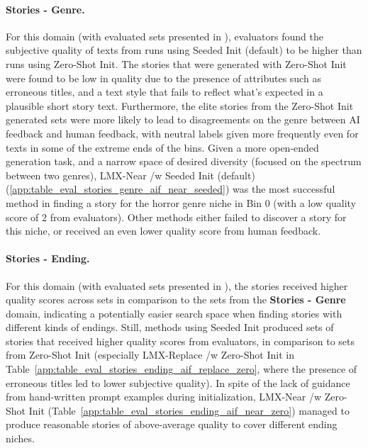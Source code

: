 \paragraph{Stories - Genre.}
For this domain (with evaluated sets presented in ), evaluators found the subjective quality of texts from runs using Seeded Init (default) to be higher than runs using Zero-Shot Init. The stories that were generated with Zero-Shot Init were found to be low in quality due to the presence of attributes such as erroneous titles, and a text style that fails to reflect what's expected in a plausible short story text. Furthermore, the elite stories from the Zero-Shot Init generated sets were more likely to lead to disagreements on the genre between AI feedback and human feedback, with neutral labels given more frequently even for texts in some of the extreme ends of the bins. Given a more open-ended generation task, and a narrow space of desired diversity (focused on the spectrum between two genres), LMX-Near /w Seeded Init (default) (\cref{app:table_eval_stories_genre_aif_near_seeded}) was the most successful method in finding a story for the horror genre niche in Bin 0 (with a low quality score of 2 from evaluators). Other methods either failed to discover a story for this niche, or received an even lower quality score from human feedback.

\paragraph{Stories - Ending.}
For this domain (with evaluated sets presented in ), the stories received higher quality scores across sets in comparison to the sets from the \textbf{Stories - Genre} domain, indicating a potentially easier search space when finding stories with different kinds of endings. Still, methods using Seeded Init produced sets of stories that received higher quality scores from evaluators, in comparison to sets from Zero-Shot Init (especially LMX-Replace /w Zero-Shot Init in Table~\ref{app:table_eval_stories_ending_aif_replace_zero}, where the presence of erroneous titles led to lower subjective quality). In spite of the lack of guidance from hand-written prompt examples during initialization, LMX-Near /w Zero-Shot Init (Table~\ref{app:table_eval_stories_ending_aif_near_zero}) managed to produce reasonable stories of above-average quality to cover different ending niches.

